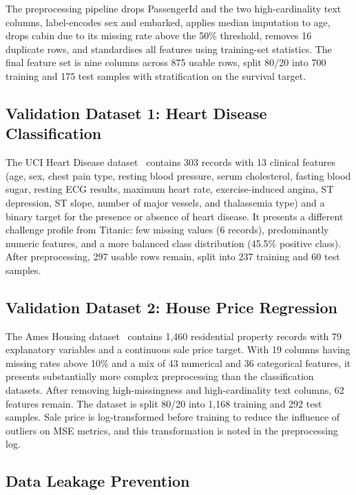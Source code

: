 \documentclass[conference]{IEEEtran}
\begin{document}
The preprocessing pipeline drops PassengerId and the two high-cardinality text columns, label-encodes sex and embarked, applies median imputation to age, drops cabin due to its missing rate above the 50\% threshold, removes 16 duplicate rows, and standardises all features using training-set statistics. The final feature set is nine columns across 875 usable rows, split 80/20 into 700 training and 175 test samples with stratification on the survival target.

\subsection{Validation Dataset 1: Heart Disease Classification}

The UCI Heart Disease dataset~\cite{b33} contains 303 records with 13 clinical features (age, sex, chest pain type, resting blood pressure, serum cholesterol, fasting blood sugar, resting ECG results, maximum heart rate, exercise-induced angina, ST depression, ST slope, number of major vessels, and thalassemia type) and a binary target for the presence or absence of heart disease. It presents a different challenge profile from Titanic: few missing values (6 records), predominantly numeric features, and a more balanced class distribution (45.5\% positive class). After preprocessing, 297 usable rows remain, split into 237 training and 60 test samples.

\subsection{Validation Dataset 2: House Price Regression}

The Ames Housing dataset~\cite{b34} contains 1,460 residential property records with 79 explanatory variables and a continuous sale price target. With 19 columns having missing rates above 10\% and a mix of 43 numerical and 36 categorical features, it presents substantially more complex preprocessing than the classification datasets. After removing high-missingness and high-cardinality text columns, 62 features remain. The dataset is split 80/20 into 1,168 training and 292 test samples. Sale price is log-transformed before training to reduce the influence of outliers on MSE metrics, and this transformation is noted in the preprocessing log.

\subsection{Data Leakage Prevention}
\end{document}
